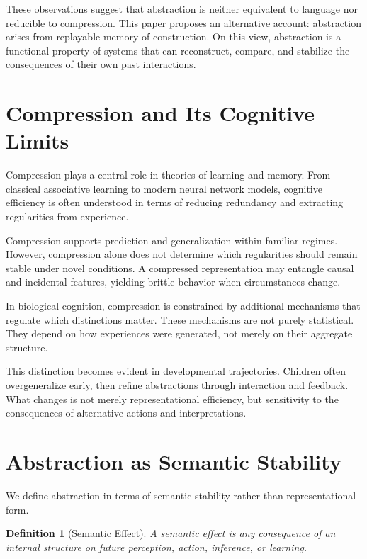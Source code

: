 \documentclass[11pt]{article}
\newtheorem{definition}{Definition}[section]
\begin{document}
These observations suggest that abstraction is neither equivalent to language nor reducible to compression. This paper proposes an alternative account: abstraction arises from replayable memory of construction. On this view, abstraction is a functional property of systems that can reconstruct, compare, and stabilize the consequences of their own past interactions.

\section{Compression and Its Cognitive Limits}

Compression plays a central role in theories of learning and memory. From classical associative learning to modern neural network models, cognitive efficiency is often understood in terms of reducing redundancy and extracting regularities from experience.

Compression supports prediction and generalization within familiar regimes. However, compression alone does not determine which regularities should remain stable under novel conditions. A compressed representation may entangle causal and incidental features, yielding brittle behavior when circumstances change.

In biological cognition, compression is constrained by additional mechanisms that regulate which distinctions matter. These mechanisms are not purely statistical. They depend on how experiences were generated, not merely on their aggregate structure.

This distinction becomes evident in developmental trajectories. Children often overgeneralize early, then refine abstractions through interaction and feedback. What changes is not merely representational efficiency, but sensitivity to the consequences of alternative actions and interpretations.

\section{Abstraction as Semantic Stability}

We define abstraction in terms of semantic stability rather than representational form.

\begin{definition}[Semantic Effect]
A semantic effect is any consequence of an internal structure on future perception, action, inference, or learning.
\end{definition}
\end{document}
